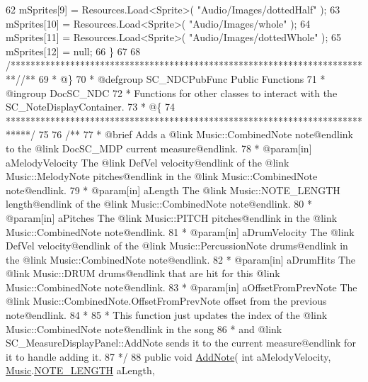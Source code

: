 \begin{DoxyCodeInclude}
62         mSprites[9] = Resources.Load<Sprite>( \textcolor{stringliteral}{"Audio/Images/dottedHalf"} );
63         mSprites[10] = Resources.Load<Sprite>( \textcolor{stringliteral}{"Audio/Images/whole"} );
64         mSprites[11] = Resources.Load<Sprite>( \textcolor{stringliteral}{"Audio/Images/dottedWhole"} );
65         mSprites[12] = null;
66     \}
67 
68     \textcolor{comment}{/*************************************************************************/}\textcolor{comment}{/** }
69 \textcolor{comment}{    * @\}}
70 \textcolor{comment}{    * @defgroup SC\_NDCPubFunc Public Functions}
71 \textcolor{comment}{    * @ingroup DocSC\_NDC}
72 \textcolor{comment}{    * Functions for other classes to interact with the SC\_NoteDisplayContainer.}
73 \textcolor{comment}{    * @\{}
74 \textcolor{comment}{    *****************************************************************************/}
75 \textcolor{comment}{}
76 \textcolor{comment}{    /**}
77 \textcolor{comment}{     * @brief Adds a @link Music::CombinedNote note@endlink to the @link DocSC\_MDP current measure@endlink.
       }
78 \textcolor{comment}{     * @param[in] aMelodyVelocity The @link DefVel velocity@endlink of the @link Music::MelodyNote
       pitches@endlink in the @link Music::CombinedNote note@endlink.}
79 \textcolor{comment}{     * @param[in] aLength The @link Music::NOTE\_LENGTH length@endlink of the @link Music::CombinedNote
       note@endlink.}
80 \textcolor{comment}{     * @param[in] aPitches The @link Music::PITCH pitches@endlink in the @link Music::CombinedNote
       note@endlink.}
81 \textcolor{comment}{     * @param[in] aDrumVelocity The @link DefVel velocity@endlink of the @link Music::PercussionNote
       drums@endlink in the @link Music::CombinedNote note@endlink.}
82 \textcolor{comment}{     * @param[in] aDrumHits The @link Music::DRUM drums@endlink that are hit for this @link
       Music::CombinedNote note@endlink.}
83 \textcolor{comment}{     * @param[in] aOffsetFromPrevNote The @link Music::CombinedNote.OffsetFromPrevNote offset from the
       previous note@endlink.}
84 \textcolor{comment}{     * }
85 \textcolor{comment}{     * This function just updates the index of the @link Music::CombinedNote note@endlink in the song }
86 \textcolor{comment}{     * and @link SC\_MeasureDisplayPanel::AddNote sends it to the current measure@endlink for it to handle
       adding it.}
87 \textcolor{comment}{    */}
88     \textcolor{keyword}{public} \textcolor{keywordtype}{void} \hyperlink{group___s_c___n_d_c_pub_func_ga43e58800daae0e46bbe1b86d78c2f677}{AddNote}( \textcolor{keywordtype}{int} aMelodyVelocity, \hyperlink{class_music}{Music}.\hyperlink{group___music_enums_gaf11b5f079adbb21c800b9eca1c5c3cbd}{NOTE\_LENGTH} aLength, 

\end{DoxyCodeInclude}
